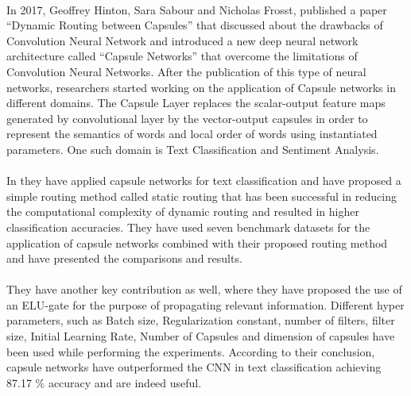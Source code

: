 \documentclass[a4paper,12pt]{report}
\begin{document}
\paragraph{}
In 2017, Geoffrey Hinton, Sara Sabour and Nicholas Frosst, published a paper “Dynamic Routing between Capsules” \cite{S. Sabour} that discussed about the drawbacks of Convolution Neural Network and introduced a new deep neural network architecture called “Capsule Networks” that overcome the limitations of Convolution Neural Networks. \cite{Hinton} After the publication of this type of neural networks, researchers started working on the application of Capsule networks in different domains. The Capsule Layer replaces the scalar-output feature maps generated by convolutional layer by the vector-output capsules in order to represent the semantics of words and local order of words using instantiated parameters. \cite{Lai} One such domain is Text Classification and Sentiment Analysis. 

\paragraph{}
In \cite{Jaeyoung} they have applied capsule networks for text classification and have proposed a simple routing method called static routing that has been successful in reducing the computational complexity of dynamic routing and resulted in higher classification accuracies. They have used seven benchmark datasets for the application of capsule networks combined with their proposed routing method and have presented the comparisons and results. 

\paragraph{}
They have another key contribution as well, where they have proposed the use of an ELU-gate for the purpose of propagating relevant information. Different hyper parameters, such as Batch size, Regularization constant, number of filters, filter size, Initial Learning Rate, Number of Capsules and dimension of capsules have been used while performing the experiments. According to their conclusion, capsule networks have outperformed the CNN in text classification achieving 87.17 \% accuracy and are indeed useful.
\end{document}
